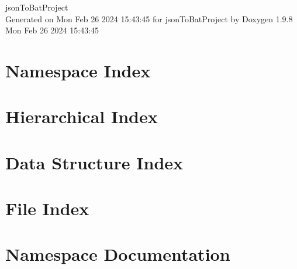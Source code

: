 \documentclass[twoside]{book}
\newcommand{\+}{\discretionary{\mbox{\scriptsize$\hookleftarrow$}}{}{}}
\newcommand{\clearemptydoublepage}{%
    \newpage{\pagestyle{empty}\cleardoublepage}%
  }
\begin{document}
  \raggedbottom
    \hypersetup{pageanchor=false,
                bookmarksnumbered=true,
                pdfencoding=unicode
               }
  \begin{titlepage}
  \vspace*{7cm}
  \begin{center}%
  {\Large json\+To\+Bat\+Project}\\
  \vspace*{1cm}
  {\large Generated on Mon Feb 26 2024 15\+:43\+:45 for json\+To\+Bat\+Project by Doxygen 1.9.8}\\
    \vspace*{0.5cm}
    {\small Mon Feb 26 2024 15:43:45}
  \end{center}
  \end{titlepage}
  \clearemptydoublepage
  \tableofcontents
  \clearemptydoublepage
  \hypersetup{pageanchor=true}


\chapter{Namespace Index}

\chapter{Hierarchical Index}

\chapter{Data Structure Index}

\chapter{File Index}

\chapter{Namespace Documentation}











\end{document}
